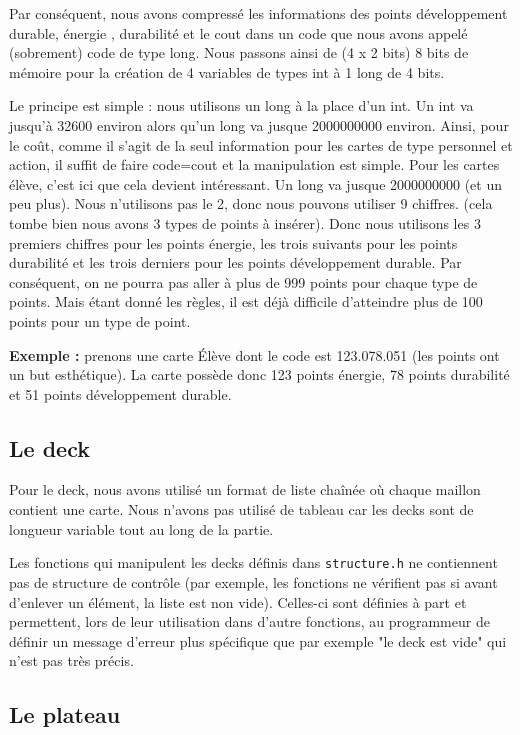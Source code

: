 \documentclass[11pt]{article}
\begin{document}
Par conséquent, nous avons compressé les informations des points développement durable, énergie , durabilité et le cout dans un code que nous avons appelé (sobrement) code de type long. Nous passons ainsi de (4 x 2 bits) 8 bits de mémoire pour la création de 4 variables de types int à 1 long de 4 bits.

Le principe est simple : nous utilisons un long à la place d'un int. Un int va jusqu'à 32600 environ alors qu'un long va jusque 2000000000 environ. Ainsi, pour le coût, comme il s'agit de la seul information pour les cartes de type personnel et action, il suffit de  faire code=cout et la manipulation est simple. Pour les cartes élève, c'est ici que cela devient intéressant. Un long va jusque 2000000000 (et un peu plus). Nous n'utilisons pas le 2, donc nous pouvons utiliser 9 chiffres. (cela tombe bien nous avons 3 types de points à insérer). Donc nous utilisons les 3 premiers chiffres pour les points énergie, les trois suivants pour les points durabilité et les trois derniers pour les points développement durable.  Par conséquent, on ne pourra pas aller à plus de 999 points pour chaque type de points. Mais étant donné les règles, il est déjà difficile d'atteindre plus de 100 points pour un type de point.

\textbf{Exemple :} prenons une carte Élève dont le code est 123.078.051 (les points ont un but esthétique). La carte possède donc 123 points énergie, 78 points durabilité et 51 points développement durable.

\subsection{Le deck}

Pour le deck, nous avons utilisé un format de liste chaînée où chaque maillon contient une carte. Nous n'avons pas utilisé de tableau car les decks sont de longueur variable tout au long de la partie.

Les fonctions qui manipulent les decks définis dans \texttt{structure.h} ne contiennent pas de structure de contrôle (par exemple, les fonctions ne vérifient pas si avant d'enlever un élément, la liste est non vide). Celles-ci sont définies à part et permettent, lors de leur utilisation dans d'autre fonctions, au programmeur de définir un message d'erreur plus spécifique que par exemple "le deck est vide" qui n'est pas très précis.

\subsection{Le plateau}
\end{document}
